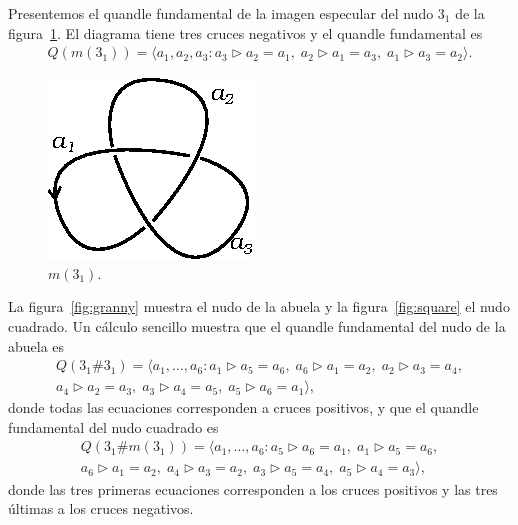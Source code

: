 \documentclass[graybox]{svmult}
\begin{document}
	Presentemos el quandle fundamental de la imagen especular del nudo $3_1$ de
	la figura~\ref{fig:3_1m}. El diagrama tiene tres cruces negativos y el
	quandle fundamental es
	\begin{align*}
		Q(m(3_1))=\langle a_1,a_2,a_3:
		a_3\triangleright a_2=a_1,\;
		a_2\triangleright a_1=a_3,\;
		a_1\triangleright a_3=a_2\rangle.
	\end{align*}

	\begin{figure}[ht]
	    \centering
	    \includegraphics[scale=0.7]{images/3_1m}
		\caption{$m(3_1)$.}
    	\label{fig:3_1m}
	\end{figure}

    La figura~\ref{fig:granny} muestra el nudo de la abuela y la
    figura~\ref{fig:square} el nudo cuadrado.  Un cálculo sencillo muestra que 
    el quandle fundamental del nudo de la abuela es
    \begin{multline*}
		Q(3_1\#3_1)=\langle a_1,\dots,a_6:
        a_1\triangleright a_5=a_6,\;
        a_6\triangleright a_1=a_2,\;
        a_2\triangleright a_3=a_4,\\
		a_4\triangleright a_2=a_3,\;
        a_3\triangleright a_4=a_5,\;
        a_5\triangleright a_6=a_1\rangle,
	\end{multline*}
    donde todas las ecuaciones corresponden a cruces positivos, 
    y que el quandle fundamental del nudo cuadrado es
    \begin{multline}
		Q(3_1\#m(3_1))=\langle a_1,\dots,a_6:
        a_5\triangleright a_6=a_1,\;
		a_1\triangleright a_5=a_6,\\
        a_6\triangleright a_1=a_2,\;
        a_4\triangleright a_3=a_2,\;
		a_3\triangleright a_5=a_4,\;
        a_5\triangleright a_4=a_3\rangle,
    \end{multline}
    donde las tres primeras ecuaciones corresponden a los cruces positivos y
   	las tres últimas a los cruces negativos.
\end{document}
